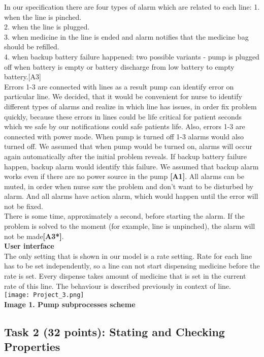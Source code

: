 \documentclass{article}
\newcommand{\head}{\subsection*}
\begin{document}
In our specification there are four types of alarm which are related to each line: 
1. when the line is pinched.\\
2. when the line is plugged.\\
3. when medicine in the line is ended and alarm notifies that the medicine bag should be refilled.\\
4. when backup battery failure happened: two possible variants - pump is plugged off when battery is empty or battery discharge from low battery to empty battery.[A3]\\
 Errors 1-3 are connected with lines as a result pump can identify error on particular line. We decided, that it would be convenient for nurse to identify different types of alarms and realize in which line has issues, in order fix problem quickly, because these errors in lines could be life critical for patient seconds which we safe by our notifications could safe patients life. Also, errors 1-3 are connected with power mode. When pump is turned off 1-3 alarms would also turned off. We assumed that when pump would be turned on, alarms will occur again automatically after the initial problem reveals. If backup battery failure happen, backup alarm would identify this failure. We assumed that backup alarm works even if there are no power source in the pump \textbf{[A1]}.
All alarms can be muted, in order when nurse saw the problem and don't want to be disturbed by alarm. And all alarms have action alarm, which would happen until the error will not be fixed.\\
There is some time, approximately a second, before starting the alarm. If the problem is solved to the moment (for example, line is unpinched), the alarm will not be made\textbf{[A3*]}.\\

\textbf{User interface} \\

The only setting that is shown in our model is a rate setting. Rate for each line has to be set independently, so a line can not start dispensing medicine before the rate is set. Every dispense takes amount of medicine that is set in the current rate of this line. The behaviour is described previously in context of line.\\


\texttt{[image: Project\_3.png]}\\
\textbf{Image 1. Pump subprocesses scheme} \\


\head{Task 2 (32 points): Stating and Checking Properties}
\end{document}

